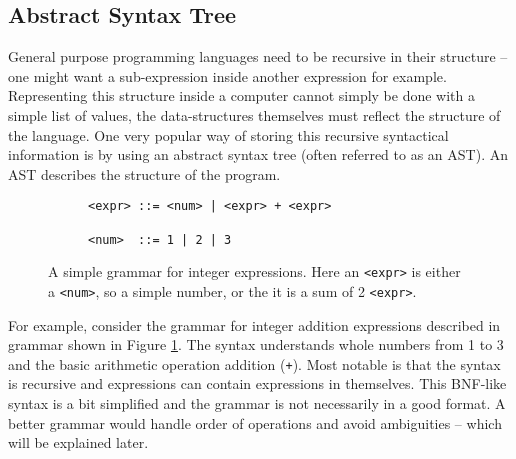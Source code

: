 \subsection{Abstract Syntax Tree}
General purpose programming languages need to be recursive in their structure -- one might want a sub-expression inside another expression for example. Representing this structure inside a computer cannot simply be done with a simple list of values, the data-structures themselves must reflect the structure of the language. One very popular way of storing this recursive syntactical information is by using an abstract syntax tree (often referred to as an AST). An AST describes the structure of the program.


\begin{figure}
\centering
\begin{subfigure}{.5\textwidth}
  \begin{verbatim}
<expr> ::= <num> | <expr> + <expr>

<num>  ::= 1 | 2 | 3
\end{verbatim}
\end{subfigure}
  \cprotect\caption{A simple grammar for integer expressions. Here an \verb|<expr>| is either a \verb|<num>|, so a simple number, or the it is a sum of 2 \verb|<expr>|.}
  \label{fig:bnfExpr}
\end{figure}
For example, consider the grammar for integer addition expressions described in grammar shown in Figure \ref{fig:bnfExpr}. The syntax understands whole numbers from 1 to 3 and the basic arithmetic operation addition (\verb!+!). Most notable is that the syntax is recursive and expressions can contain expressions in themselves. This BNF-like syntax is a bit simplified and the grammar is not necessarily in a good format. A better grammar would handle order of operations and avoid ambiguities -- which will be explained later.

